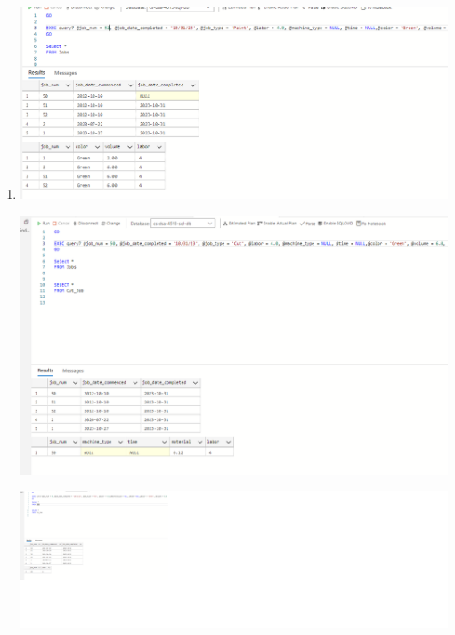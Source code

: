 \documentclass[11pt]{article}
\begin{document}
\begin{enumerate}
\item %

\includegraphics[width = \textwidth]{updateJobs1.png}

\includegraphics[width = \textwidth]{updateJobs2.png}

\includegraphics[width = \textwidth]{updateJobs3.png}


\end{enumerate}
\end{document}
